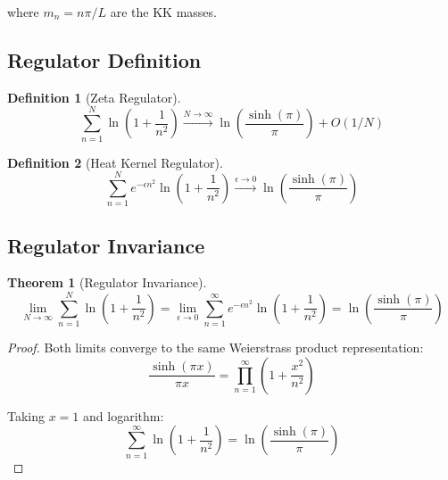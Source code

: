 \documentclass[11pt,a4paper]{article}
\theoremstyle{definition}
\newtheorem{definition}{Definition}[section]
\newtheorem{theorem}{Theorem}[section]
\begin{document}
where $m_n = n\pi/L$ are the KK masses.

\subsection{Regulator Definition}
\label{subsec:regulator}

\begin{definition}[Zeta Regulator]
\label{def:zeta-reg}
\begin{equation}
\label{eq:zeta-reg}
\sum_{n=1}^{N} \ln\left(1 + \frac{1}{n^2}\right) \xrightarrow{N\to\infty}
  \ln\left(\frac{\sinh(\pi)}{\pi}\right) + O(1/N)
\end{equation}
\end{definition}

\begin{definition}[Heat Kernel Regulator]
\label{def:heat-reg}
\begin{equation}
\label{eq:heat-reg}
\sum_{n=1}^{N} e^{-\epsilon n^2} \ln\left(1 + \frac{1}{n^2}\right) \xrightarrow{\epsilon\to 0}
  \ln\left(\frac{\sinh(\pi)}{\pi}\right)
\end{equation}
\end{definition}

\subsection{Regulator Invariance}
\label{subsec:reg-invariance}

\begin{theorem}[Regulator Invariance]
\label{thm:reg-invariance}
\begin{equation}
\label{eq:reg-match}
\lim_{N\to\infty} \sum_{n=1}^{N} \ln\left(1 + \frac{1}{n^2}\right)
  = \lim_{\epsilon\to 0} \sum_{n=1}^{\infty} e^{-\epsilon n^2} \ln\left(1 + \frac{1}{n^2}\right)
  = \ln\left(\frac{\sinh(\pi)}{\pi}\right)
\end{equation}
\end{theorem}

\begin{proof}
Both limits converge to the same Weierstrass product representation:
\begin{equation}
\label{eq:weierstrass}
\frac{\sinh(\pi x)}{\pi x} = \prod_{n=1}^{\infty}\left(1 + \frac{x^2}{n^2}\right)
\end{equation}

Taking $x = 1$ and logarithm:
\begin{equation}
\label{eq:weierstrass-log}
\sum_{n=1}^{\infty} \ln\left(1 + \frac{1}{n^2}\right) = \ln\left(\frac{\sinh(\pi)}{\pi}\right)
\end{equation}
\end{proof}
\end{document}
